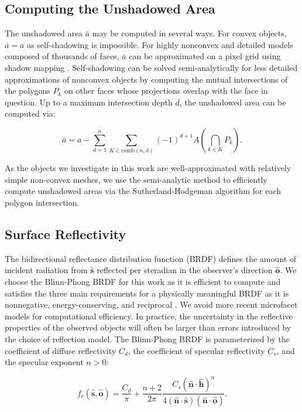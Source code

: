 \documentclass[a4paper,twocolumn]{spaceDebrisC} %
\newcommand{\vctr}[1]{\bm{#1}}
\newcommand{\unitv}[1]{\hat{\vctr{#1}}}
\begin{document}
\subsection{Computing the Unshadowed Area}

The unshadowed area $\bar{a}$ may be computed in several ways. For convex objects, $\bar{a}=a$ as self-shadowing is impossible. For highly nonconvex and detailed models composed of thousands of faces, $\bar{a}$ can be approximated on a pixel grid using shadow mapping \cite{robinson2022}. Self-shadowing can be solved semi-analytically for less detailed approximations of nonconvex objects by computing the mutual intersections of the polygons $P_k$ on other faces whose projections overlap with the face in question. Up to a maximum intersection depth $d$, the unshadowed area can be computed via:

\begin{equation} \label{eq:us_area}
 \bar{a} = a - \sum_{d=1}^{n} \sum_{K \in \text{comb}(n,d)} (-1)^{d+1} A\left(\bigcap\limits_{k \in K} P_k\right).
\end{equation}

As the objects we investigate in this work are well-approximated with relatively simple non-convex meshes, we use the semi-analytic method to efficiently compute unshadowed areas via the Sutherland-Hodgeman algorithm \cite{sutherland1974} for each polygon intersection.

\subsection{Surface Reflectivity}

The bidirectional reflectance distribution function (BRDF) defines the amount of incident radiation from $\unitv{s}$ reflected per steradian in the observer's direction $\unitv{o}$. We choose the Blinn-Phong \cite{blinn1977} BRDF for this work as it is efficient to compute and satisfies the three main requirements for a physically meaningful BRDF as it is nonnegative, energy-conserving, and reciprocal \cite{duvenhage2013}. We avoid more recent microfacet models for computational efficiency. In practice, the uncertainty in the reflective properties of the observed objects will often be larger than errors introduced by the choice of reflection model. The Blinn-Phong BRDF is parameterized by the coefficient of diffuse reflectivity $C_d$, the coefficient of specular reflectivity $C_s$, and the specular exponent $n>0$:

\begin{equation} \label{eq:brdf_blinn_phong}
 f_r(\unitv{s}, \unitv{o}) = \frac{C_d}{\pi} + \frac{n+2}{2\pi} \frac{C_s (\unitv{n} \cdot \unitv{h})^n}{4 (\unitv{n} \cdot \unitv{s})(\unitv{n} \cdot \unitv{o})}.
\end{equation}
\end{document}

